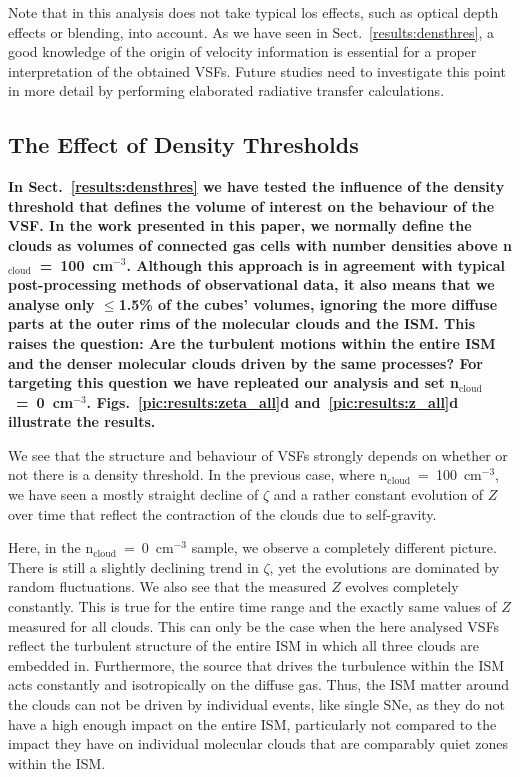 Note that in this analysis does not take typical los effects, such as optical depth effects or blending, into account. 
As we have seen in Sect.~\ref{results:densthres}, a good knowledge of the origin of velocity information is essential for a proper interpretation of the obtained VSFs.
Future studies need to investigate this point in more detail by performing elaborated radiative transfer calculations. 



\subsection{The Effect of Density Thresholds}\label{discussion:densthres}

\textbf{In Sect.~\ref{results:densthres} we have tested the influence of the density threshold that defines the volume of interest on the behaviour of the VSF.
In the work presented in this paper, we normally define the clouds as volumes of connected gas cells with number densities above n$_\mathrm{cloud}$~=~100~cm$^{-3}$.
Although this approach is in agreement with typical post-processing methods of observational data, it also means that we analyse only $\leq$1.5\% of the cubes' volumes, ignoring the more diffuse parts at the outer rims of the molecular clouds and the ISM.
This raises the question: Are the turbulent motions within the entire ISM and the denser molecular clouds driven by the same processes?
For targeting this question we have repleated our analysis and set n$_\mathrm{cloud}$~=~0~cm$^{-3}$.
Figs.~\ref{pic:results:zeta_all}d and~\ref{pic:results:z_all}d illustrate the results.
}

We see that the structure and behaviour of VSFs strongly depends on whether or not there is a density threshold. 
In the previous case, where n$_\mathrm{cloud}$~=~100~cm$^{-3}$, we have seen a mostly straight decline of $\zeta$ and a rather constant evolution of $Z$ over time that reflect the contraction of the clouds due to self-gravity.

Here, in the n$_\mathrm{cloud}$~=~0~cm$^{-3}$ sample, we observe a completely different picture.
There is still a slightly declining trend in $\zeta$, yet the evolutions are dominated by random fluctuations.
We also see that the measured $Z$ evolves completely constantly.
This is true for the entire time range and the exactly same values of $Z$ measured for all clouds.
This can only be the case when the here analysed VSFs reflect the turbulent structure of the entire ISM in which all three clouds are embedded in.
Furthermore, the source that drives the turbulence within the ISM acts constantly and isotropically on the diffuse gas.
Thus, the ISM matter around the clouds can not be driven by individual events, like single SNe, as they do not have a high enough impact on the entire ISM, particularly not compared to the impact they have on individual molecular clouds that are comparably quiet zones within the ISM.

